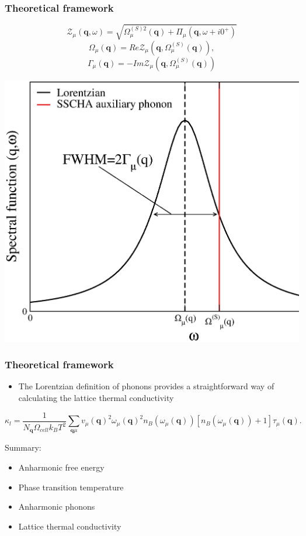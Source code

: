 \documentclass{beamer}
\begin{document}
\begin{frame}

\frametitle{Theoretical framework}
\begin{equation}
\nonumber
\mathcal{Z}_{\mu}(\mathbf{q},\omega)=\sqrt{\Omega_{\mu}^{(S)2}(\mathbf{q})+\Pi_{\mu}(\mathbf{q},\omega+i0^{+})}
\end{equation}
\begin{equation}
\nonumber
\Omega_{\mu}(\mathbf{q})=Re\mathcal{Z}_{\mu}(\mathbf{q},\Omega^{(S)}_{\mu}(\mathbf{q})),
\end{equation}
\begin{equation}
\nonumber
\Gamma_{\mu}(\mathbf{q})=-Im\mathcal{Z}_{\mu}(\mathbf{q},\Omega^{(S)}_{\mu}(\mathbf{q}))
\end{equation}
\begin{center}
  \includegraphics[width=0.6\linewidth]{Pictures/THEORY/ins-toy2.eps}
 \end{center}

\end{frame}


\begin{frame}

\frametitle{Theoretical framework}
\begin{itemize}
 \item The Lorentzian definition of phonons provides a straightforward way of calculating the lattice thermal conductivity
\end{itemize}
\begin{equation}
\nonumber
 \kappa_{l}=\frac{1}{N_{\mathbf{q}}\Omega_{cell} k_{B}T^{2}}\sum_{\mathbf{q}\mu}v_{\mu}(\mathbf{q})^{2}\omega_{\mu}(\mathbf{q})^{2}n_{B}(\omega_{\mu}(\mathbf{q}))[n_{B}(\omega_{\mu}(\mathbf{q}))+1]\tau_{\mu}(\mathbf{q}).
\end{equation}

Summary:
\begin{itemize}
\item Anharmonic free energy
\item Phase transition temperature
\item Anharmonic phonons
\item Lattice thermal conductivity
\end{itemize}

\end{frame}
\end{document}
